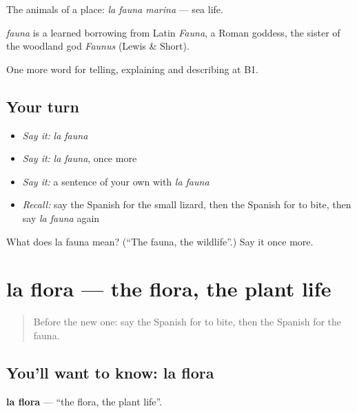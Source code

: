 The animals of a place: \emph{la fauna marina} — sea life.

\begin{cousinweb}
\emph{fauna} is a learned borrowing from Latin \emph{Fauna}, a Roman goddess, the sister of the woodland god \emph{Faunus} (Lewis \& Short).
\end{cousinweb}

\begin{grammarlens}[title={What you've built}]
One more word for telling, explaining and describing at B1.
\end{grammarlens}

\subsection*{Your turn}
\begin{itemize}
\raggedright
  \item \emph{Say it:} \emph{la fauna}
  \item \emph{Say it:} \emph{la fauna}, once more
  \item \emph{Say it:} a sentence of your own with \emph{la fauna}
  \item \emph{Recall:} say the Spanish for the small lizard, then the Spanish for to bite, then say \emph{la fauna} again
\end{itemize}

\begin{tcolorbox}[breakable,colback=teal!4,colframe=teal!35!black,title={Before you move on}]
What does la fauna mean? (\textquotedblleft{}The fauna, the wildlife\textquotedblright{}.) Say it once more.
\end{tcolorbox}
\section[la flora]{la flora — the flora, the plant life}

\label{lesson:ES-C695-flora}



\begin{quote}
Before the new one: say the Spanish for to bite, then the Spanish for the fauna.
\end{quote}

\subsection*{You'll want to know: la flora}
\textbf{la flora} — \textquotedblleft{}the flora, the plant life\textquotedblright{}.

